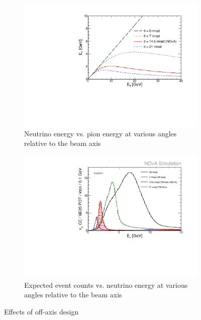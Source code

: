 \begin{figure}
\centering
\begin{subfigure}[c]{0.8\textwidth}
                \centering
                \includegraphics[width=\textwidth]{figures/plots/nova/EnuVSEpi_NOvA-0-7-21.pdf}
                \caption{Neutrino energy vs. pion energy at various angles relative to the beam axis}
                 \label{EnuEpi}
        \end{subfigure}


\begin{subfigure}[c]{0.8\textwidth}
                \centering
                \includegraphics[width=\textwidth]{figures/plots/nova/spectrum_FD_NOvA-0-7-21.pdf}
                \caption{Expected \numu event counts vs. neutrino energy at various angles relative to the beam axis}
                \label{fluxEnu}

        \end{subfigure}
        \caption{Effects of off-axis design}
\end{figure}


